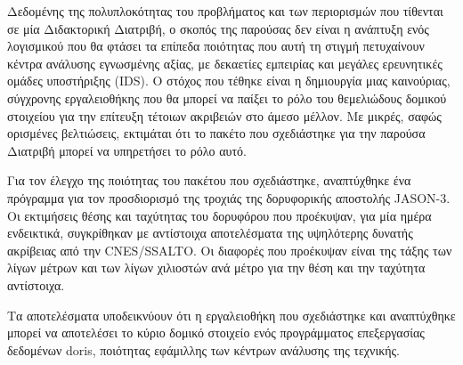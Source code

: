 Δεδομένης της πολυπλοκότητας του προβλήματος και των περιορισμών που τίθενται σε μία Διδακτορική Διατριβή,
ο σκοπός της παρούσας δεν είναι η ανάπτυξη ενός λογισμικού που θα φτάσει τα επίπεδα ποιότητας
που αυτή τη στιγμή πετυχαίνουν κέντρα ανάλυσης εγνωσμένης αξίας, με δεκαετίες εμπειρίας και
μεγάλες ερευνητικές ομάδες υποστήριξης (\textlatin{IDS}). Ο στόχος που τέθηκε είναι η δημιουργία μιας
καινούριας, σύγχρονης εργαλειοθήκης που θα μπορεί να παίξει το ρόλο του θεμελιώδους δομικού στοιχείου για
την επίτευξη τέτοιων ακριβειών στο άμεσο μέλλον. Με μικρές, σαφώς ορισμένες βελτιώσεις, εκτιμάται ότι
το πακέτο που σχεδιάστηκε για την παρούσα Διατριβή μπορεί να υπηρετήσει το ρόλο αυτό.

Για τον έλεγχο της ποιότητας του πακέτου που σχεδιάστηκε, αναπτύχθηκε ένα πρόγραμμα για τον προσδιορισμό
της τροχιάς της δορυφορικής αποστολής \textlatin{JASON}-3. Οι εκτιμήσεις θέσης και ταχύτητας του δορυφόρου
που προέκυψαν, για μία ημέρα ενδεικτικά, συγκρίθηκαν με αντίστοιχα αποτελέσματα της υψηλότερης
δυνατής ακρίβειας από την \textlatin{CNES/SSALTO}. Οι διαφορές που προέκυψαν είναι της τάξης των λίγων μέτρων
και των λίγων χιλιοστών ανά μέτρο για την θέση και την ταχύτητα αντίστοιχα.

Τα αποτελέσματα υποδεικνύουν ότι η εργαλειοθήκη που σχεδιάστηκε και αναπτύχθηκε μπορεί να
αποτελέσει το κύριο δομικό στοιχείο ενός προγράμματος επεξεργασίας δεδομένων \textlatin{doris},
ποιότητας εφάμιλλης των κέντρων ανάλυσης της τεχνικής.
\fi
{}

